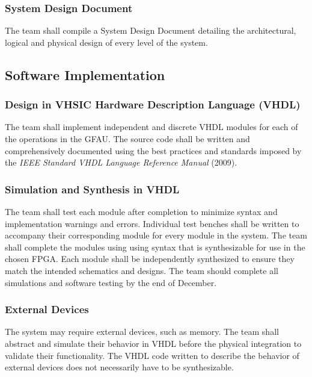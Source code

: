 \documentclass[12pt]{extarticle}
\begin{document}
            \subsubsection{System Design Document} The team shall compile a
            System Design Document detailing the architectural, logical and
            physical design of every level of the system.

        \subsection{Software Implementation}

            \subsubsection{Design in VHSIC Hardware Description Language
            (VHDL)} The team shall implement independent and discrete VHDL
            modules for each of the operations in the GFAU. The source
            code shall be written and comprehensively documented using the best
            practices and standards imposed by the \textit{IEEE Standard VHDL
            Language Reference Manual} (2009).

            \subsubsection{Simulation and Synthesis in VHDL} The team shall
            test each module after completion to minimize syntax and
            implementation warnings and errors. Individual test benches shall
            be written to accompany their corresponding module for every module
            in the system. The team shall complete the modules using using
            syntax that is synthesizable for use in the chosen FPGA. Each
            module shall be independently synthesized to ensure they match the
            intended schematics and designs. The team should complete all
            simulations and software testing by the end of December.

            \subsubsection{External Devices} The system may require external
            devices, such as memory. The team shall abstract and simulate their
            behavior in VHDL before the physical integration to validate their
            functionality. The VHDL code written to describe the behavior of
            external devices does not necessarily have to be synthesizable.
\end{document}
